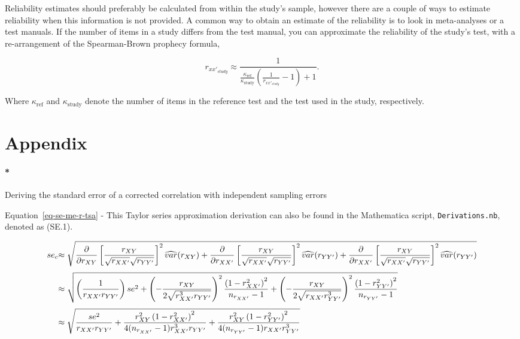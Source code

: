 \documentclass[
  letterpaper,
  DIV=11,
  numbers=noendperiod]{scrreprt}
\let\oldparagraph\paragraph
\renewcommand{\paragraph}[1]{\oldparagraph{#1}\mbox{}}
\begin{document}
Reliability estimates should preferably be calculated from within the
study's sample, however there are a couple of ways to estimate
reliability when this information is not provided. A common way to
obtain an estimate of the reliability is to look in meta-analyses or a
test manuals. If the number of items in a study differs from the test
manual, you can approximate the reliability of the study's test, with a
re-arrangement of the Spearman-Brown prophecy formula,

\[
r_{xx'_{study}} \approx \frac{1}{\frac{\kappa_{\text{ref}}}{\kappa_{\text{study}}} \left(\frac{1}{r_{xx'_{study}}} - 1\right) + 1}. 
\]

Where \(\kappa_{\text{ref}}\) and \(\kappa_{\text{study}}\) denote the
number of items in the reference test and the test used in the study,
respectively.

\section{Appendix}\label{appendix}

\paragraph*{Deriving the standard error of a corrected correlation with
independent sampling
errors}\label{deriving-the-standard-error-of-a-corrected-correlation-with-independent-sampling-errors}

Equation~\ref{eq-se-me-r-tsa} - This Taylor series approximation
derivation can also be found in the Mathematica script,
\texttt{Derivations.nb}, denoted as (SE.1).

\[\begin{aligned}
\tiny{se_c} &\tiny{\approx \sqrt{\frac{\partial}{\partial r_{XY}}\left[\frac{r_{XY}}{\sqrt{r_{XX'}}\sqrt{r_{YY'}}}\right]^2 \widehat{var}(r_{XY}) + \frac{\partial}{\partial r_{XX'}}\left[\frac{r_{XY}}{\sqrt{r_{XX'}}\sqrt{r_{YY'}}}\right]^2  \widehat{var}(r_{YY'}) + \frac{\partial}{\partial r_{XX'}}\left[\frac{r_{XY}}{\sqrt{r_{XX'}}\sqrt{r_{YY'}}}\right]^2 \widehat{var}(r_{YY'})}}\\[.3em]
&\tiny{\approx \sqrt{ \left(\frac{1}{r_{XX'}r_{YY'}}\right) se^2 + \left( -\frac{r_{XY}}{2\sqrt{r_{XX'}^3r_{YY'}}} \right)^2\frac{\left(1-r^2_{XX'}\right)^2}{n_{r_{XX'}}-1}+  \left(  -\frac{r_{XY}}{2\sqrt{r_{XX'}r_{YY'}^3}} \right)^2\frac{\left(1-r^2_{YY'}\right)^2}{n_{r_{YY'}}-1}}}\\[.3em]
&\tiny{\approx \sqrt{\frac{se^2}{r_{XX'}r_{YY'}} + 
\frac{r^2_{XY}\left(1-r^2_{XX'}\right)^2}{4(n_{r_{XX'}}-1)r_{XX'}^3r_{YY'}} + 
\frac{r^2_{XY}\left(1-r^2_{YY'}\right)^2}{4(n_{r_{YY'}}-1)r_{XX'}r_{YY'}^3}}}
\end{aligned}\]
\end{document}
